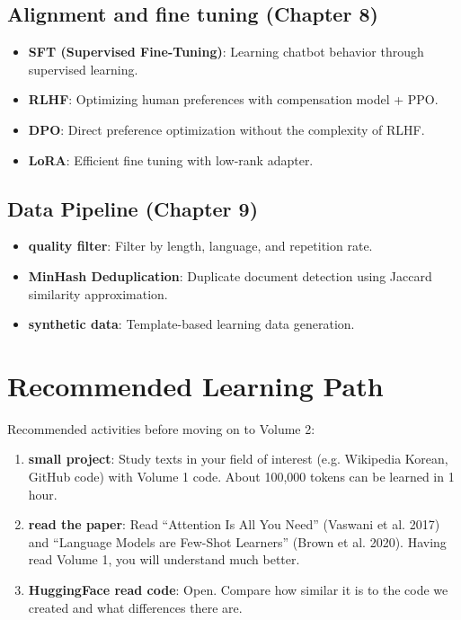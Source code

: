 \subsection{Alignment and fine tuning (Chapter 8)}

\begin{itemize}
\item\textbf{SFT (Supervised Fine-Tuning)}: Learning chatbot behavior through supervised learning.
\item\textbf{RLHF}: Optimizing human preferences with compensation model + PPO.
\item\textbf{DPO}: Direct preference optimization without the complexity of RLHF.
\item\textbf{LoRA}: Efficient fine tuning with low-rank adapter.
\end{itemize}

\subsection{Data Pipeline (Chapter 9)}

\begin{itemize}
\item\textbf{quality filter}: Filter by length, language, and repetition rate.
\item\textbf{MinHash Deduplication}: Duplicate document detection using Jaccard similarity approximation.
\item\textbf{synthetic data}: Template-based learning data generation.
\end{itemize}

\section{Recommended Learning Path}

Recommended activities before moving on to Volume 2:

\begin{enumerate}
\item\textbf{small project}: Study texts in your field of interest (e.g. Wikipedia Korean, GitHub code) with Volume 1 code. About 100,000 tokens can be learned in 1 hour.
\item\textbf{read the paper}: Read ``Attention Is All You Need'' (Vaswani et al. 2017) and ``Language Models are Few-Shot Learners'' (Brown et al. 2020). Having read Volume 1, you will understand much better.
\item\textbf{HuggingFace read code}: Open. Compare how similar it is to the code we created and what differences there are.
\end{enumerate}

